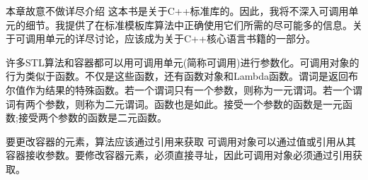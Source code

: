 

\begin{myNotic}{本章故意不做详尽介绍}
这本书是关于C++标准库的。因此，我将不深入可调用单元的细节。我提供了在标准模板库算法中正确使用它们所需的尽可能多的信息。关于可调用单元的详尽讨论，应该成为关于C++核心语言书籍的一部分。
\end{myNotic}

许多STL算法和容器都可以用可调用单元(简称可调用)进行参数化。可调用对象的行为类似于函数。不仅是这些函数，还有函数对象和Lambda函数。谓词是返回布尔值作为结果的特殊函数。若一个谓词只有一个参数，则称为一元谓词。若一个谓词有两个参数，则称为二元谓词。函数也是如此。接受一个参数的函数是一元函数;接受两个参数的函数是二元函数。

\begin{myTip}{要更改容器的元素，算法应该通过引用来获取}
可调用对象可以通过值或引用从其容器接收参数。要修改容器元素，必须直接寻址，因此可调用对象必须通过引用获取。
\end{myTip}